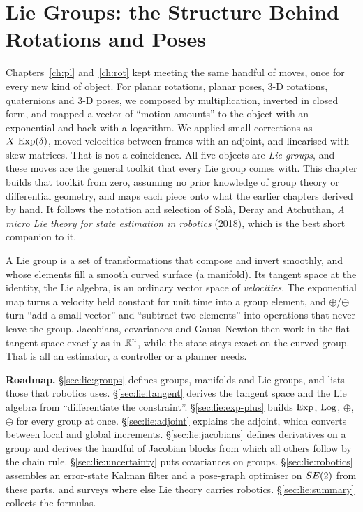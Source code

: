 \documentclass[../../notes.tex]{subfiles}
\begin{document}

\chapter{Lie Groups: the Structure Behind Rotations and Poses}\label{ch:lie}

Chapters~\ref{ch:pl} and~\ref{ch:rot} kept meeting the same handful of moves, once for every new kind of object. For planar rotations, planar poses, 3-D rotations, quaternions and 3-D poses, we composed by multiplication, inverted in closed form, and mapped a vector of ``motion amounts'' to the object with an exponential and back with a logarithm. We applied small corrections as $X\,\operatorname{Exp}(\delta)$, moved velocities between frames with an adjoint, and linearised with skew matrices. That is not a coincidence. All five objects are \emph{Lie groups}, and these moves are the general toolkit that every Lie group comes with. This chapter builds that toolkit from zero, assuming no prior knowledge of group theory or differential geometry, and maps each piece onto what the earlier chapters derived by hand. It follows the notation and selection of Solà, Deray and Atchuthan, \emph{A micro Lie theory for state estimation in robotics} (2018), which is the best short companion to it.

\begin{keyidea}
A Lie group is a set of transformations that compose and invert smoothly, and whose elements fill a smooth curved surface (a manifold). Its tangent space at the identity, the Lie algebra, is an ordinary vector space of \emph{velocities}. The exponential map turns a velocity held constant for unit time into a group element, and $\oplus$/$\ominus$ turn ``add a small vector'' and ``subtract two elements'' into operations that never leave the group. Jacobians, covariances and Gauss--Newton then work in the flat tangent space exactly as in $\mathbb{R}^n$, while the state stays exact on the curved group. That is all an estimator, a controller or a planner needs.
\end{keyidea}

\textbf{Roadmap.} \S\ref{sec:lie:groups} defines groups, manifolds and Lie groups, and lists those that robotics uses. \S\ref{sec:lie:tangent} derives the tangent space and the Lie algebra from ``differentiate the constraint''. \S\ref{sec:lie:exp-plus} builds $\operatorname{Exp}$, $\operatorname{Log}$, $\oplus$, $\ominus$ for every group at once. \S\ref{sec:lie:adjoint} explains the adjoint, which converts between local and global increments. \S\ref{sec:lie:jacobians} defines derivatives on a group and derives the handful of Jacobian blocks from which all others follow by the chain rule. \S\ref{sec:lie:uncertainty} puts covariances on groups. \S\ref{sec:lie:robotics} assembles an error-state Kalman filter and a pose-graph optimiser on $SE(2)$ from these parts, and surveys where else Lie theory carries robotics. \S\ref{sec:lie:summary} collects the formulas.
\end{document}

